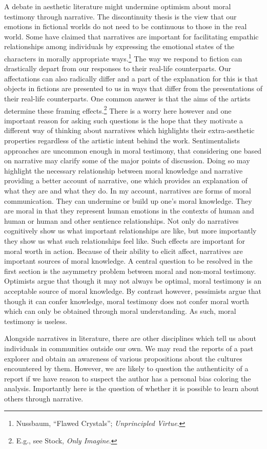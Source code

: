 \documentclass[phdthesis,12pt,final]{wuthesis}
\theoremstyle{definition}
\theoremstyle{definition}
\theoremstyle{definition}
\theoremstyle{definition}
\theoremstyle{remark}
\begin{document}
A debate in aesthetic literature might undermine optimism about moral testimony through narrative. The discontinuity thesis is the view that our emotions in fictional worlds do not need to be continuous to those in the real world. Some have claimed that narratives are important for facilitating empathic relationships among individuals by expressing the emotional states of the characters in morally appropriate ways.\footnote{Nussbaum, {``Flawed {Crystals}''}; \emph{Unprincipled {Virtue}}.} The way we respond to fiction can drastically depart from our responses to their real-life counterparts. Our affectations can also radically differ and a part of the explanation for this is that objects in fictions are presented to us in ways that differ from the presentations of their real-life counterparts. One common answer is that the aims of the artists determine these framing effects.\footnote{E.g., see Stock, \emph{Only Imagine}.} There is a worry here however and one important reason for asking such questions is the hope that they motivate a different way of thinking about narratives which highlights their extra-aesthetic properties regardless of the artistic intent behind the work. Sentimentalists approaches are uncommon enough in moral testimony, that considering one based on narrative may clarify some of the major points of discussion. Doing so may highlight the necessary relationship between moral knowledge and narrative providing a better account of narrative, one which provides an explanation of what they are and what they do. In my account, narratives are forms of moral communication. They can undermine or build up one's moral knowledge. They are moral in that they represent human emotions in the contexts of human and human or human and other sentience relationships. Not only do narratives cognitively show us what important relationships are like, but more importantly they show us what such relationships feel like. Such effects are important for moral worth in action. Because of their ability to elicit affect, narratives are important sources of moral knowledge. A central question to be resolved in the first section is the asymmetry problem between moral and non-moral testimony. Optimists argue that though it may not always be optimal, moral testimony is an acceptable source of moral knowledge. By contrast however, pessimists argue that though it can confer knowledge, moral testimony does not confer moral worth which can only be obtained through moral understanding. As such, moral testimony is useless.

Alongside narratives in literature, there are other disciplines which tell us about individuals in communities outside our own. We may read the reports of a past explorer and obtain an awareness of various propositions about the cultures encountered by them. However, we are likely to question the authenticity of a report if we have reason to suspect the author has a personal bias coloring the analysis. Importantly here is the question of whether it is possible to learn about others through narrative.
\end{document}
